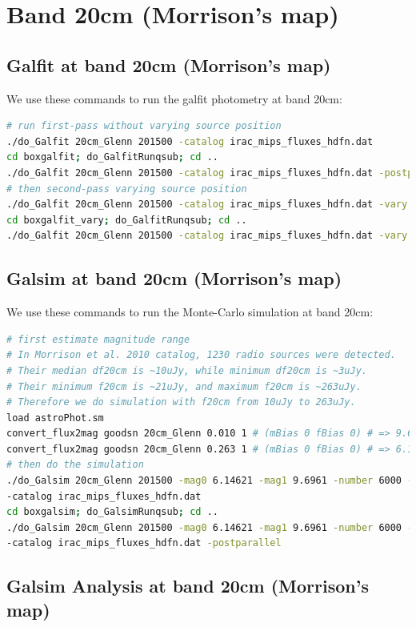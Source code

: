 \documentclass[11pt,a4paper]{article}
\begin{document}
\section{Band 20cm (Morrison's map)}

\subsection{Galfit at band 20cm (Morrison's map)}

We use these commands to run the galfit photometry at band 20cm:

\begin{lstlisting}[language=bash]
# run first-pass without varying source position
./do_Galfit 20cm_Glenn 201500 -catalog irac_mips_fluxes_hdfn.dat
cd boxgalfit; do_GalfitRunqsub; cd ..
./do_Galfit 20cm_Glenn 201500 -catalog irac_mips_fluxes_hdfn.dat -postparallel
# then second-pass varying source position
./do_Galfit 20cm_Glenn 201500 -catalog irac_mips_fluxes_hdfn.dat -vary
cd boxgalfit_vary; do_GalfitRunqsub; cd ..
./do_Galfit 20cm_Glenn 201500 -catalog irac_mips_fluxes_hdfn.dat -vary -postparallel
\end{lstlisting}

\subsection{Galsim at band 20cm (Morrison's map)}

We use these commands to run the Monte-Carlo simulation at band 20cm:

\begin{lstlisting}[language=bash]
# first estimate magnitude range
# In Morrison et al. 2010 catalog, 1230 radio sources were detected. 
# Their median df20cm is ~10uJy, while minimum df20cm is ~3uJy. 
# Their minimum f20cm is ~21uJy, and maximum f20cm is ~263uJy. 
# Therefore we do simulation with f20cm from 10uJy to 263uJy. 
load astroPhot.sm
convert_flux2mag goodsn 20cm_Glenn 0.010 1 # (mBias 0 fBias 0) # => 9.6961
convert_flux2mag goodsn 20cm_Glenn 0.263 1 # (mBias 0 fBias 0) # => 6.14621
# then do the simulation
./do_Galsim 20cm_Glenn 201500 -mag0 6.14621 -mag1 9.6961 -number 6000 -vary \
-catalog irac_mips_fluxes_hdfn.dat
cd boxgalsim; do_GalsimRunqsub; cd ..
./do_Galsim 20cm_Glenn 201500 -mag0 6.14621 -mag1 9.6961 -number 6000 -vary \
-catalog irac_mips_fluxes_hdfn.dat -postparallel
\end{lstlisting}

\subsection{Galsim Analysis at band 20cm (Morrison's map)}
\end{document}

